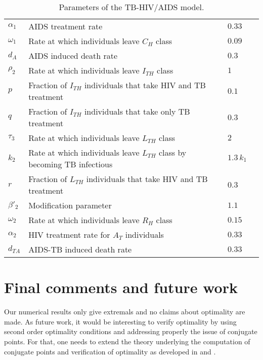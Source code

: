 \documentclass{my_aims}
\theoremstyle{definition}
\begin{document}
\begin{table}[!htb]
\begin{tabular}{l  p{6.5cm} l  l }
{\small{$\alpha_1$}} & {\small{AIDS treatment rate}}
&  {\small{$0.33 $}} & {\small{\cite{Bhunu:BMB:2009:HIV:TB}}} \\
{\small{$\omega_1$}} & {\small{Rate at which individuals leave $C_H$ class}}
&  {\small{$0.09$}} &  \\
{\small{$d_A$}} & {\small{AIDS induced death rate}} &  {\small{$0.3 $}} &  \\
{\small{$\rho_2$}} & {\small{Rate at which individuals leave $I_{TH}$ class}}
&  {\small{$1 $}} &  \\
{\small{$p$}} & {\small{Fraction of $I_{TH}$ individuals that take HIV and TB treatment}}
&  {\small{$0.1$}} &  \\
{\small{$q$}} & {\small{Fraction of $I_{TH}$ individuals that take only TB treatment }}
&  {\small{$0.3$}} &  \\
{\small{$\tau_3$}} & {\small{Rate at which individuals leave $L_{TH}$ class}} &  {\small{$2$}} &  \\
{\small{$k_2$}} & {\small{Rate at which individuals leave $L_{TH}$ class by becoming TB infectious}}
&  {\small{$1.3 \, k_1$}} & \\
{\small{$r$}} & {\small{Fraction of $L_{TH}$ individuals that take HIV and TB treatment}} &  {\small{$0.3$}} &  \\
{\small{$\beta'_2$}} & {\small{Modification parameter}} &  {\small{$1.1$}} &  \\
{\small{$\omega_2$}} & {\small{Rate at which individuals leave $R_H$ class}} &  {\small{$0.15$}} &  \\
{\small{$\alpha_2$}} & {\small{HIV treatment rate for $A_T$ individuals}} &  {\small{$0.33 $}} &  \\
{\small{$d_{TA}$}} & {\small{AIDS-TB induced death rate }} &  {\small{$0.33 $}} &  \\
\hline \hline
\end{tabular}
\caption{Parameters of the TB-HIV/AIDS model.}
\label{table:parameters:TB-HIV:Chronic}
\end{table}

\section{Final comments and future work}
\label{sec:FC:fw}

Our numerical results only give extremals and no claims about optimality are made.
As future work, it would be interesting to verify optimality by using second order optimality
conditions and addressing properly the issue of conjugate points. For that, one
needs to extend the theory underlying the computation of conjugate points
and verification of optimality as developed in \cite[Section 5.3]{Book:S_L:12}
and \cite{cit:ref2}.
\end{document}

